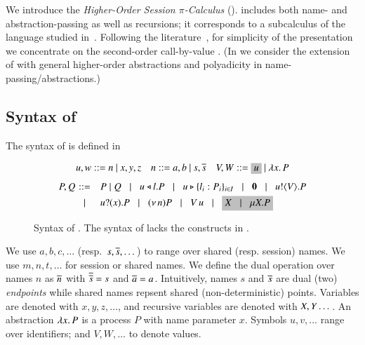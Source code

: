 \noindent 
We introduce the 
\emph{Higher-Order Session $\pi$-Calculus} (\HOp).
\HOp includes both name- and abstraction-passing 
as well as recursions; it corresponds to a subcalculus 
of the language
studied 
in~\cite{tlca07}. 
Following the literature~\cite{JeffreyR05},
for simplicity of the presentation
we concentrate on the second-order call-by-value \HOp.  
(In  we consider the extension of 
\HOp with general higher-order abstractions 
and polyadicity in name-passing/abstractions.)


\subsection{Syntax of \HOp}
\label{subsec:syntax}
\noindent{} The syntax of \HOp is defined in 
\begin{figure}[t]
\[ 
\begin{array}{lll}
u,w  ::=  n \ | \ x,y,z
& n ::= a,b  \ | \ s, \dual{s} 
& V,W  ::=   \nonhosyntax{u} \ | \ \abs{x}{P}
\end{array}
\]
\[
\begin{array}{rclllll}
P,Q \!\!\!\!\!\! & ::= & \!\! P\Par Q \bnfbar 
 \bsel{u}{l} P \bnfbar \bbra{u}{l_i:P_i}_{i \in I} \bnfbar \inact \bnfbar \bout{u}{V}{P} \\[1mm]
 & \bnfbar & \!\! \binp{u}{x}{P} \bnfbar \news{n} P 
\bnfbar 
\appl{V}{u}
\bnfbar \nonhosyntax{\rvar{X} \bnfbar \recp{X}{P}}
\end{array}
\]
 \caption{Syntax of \HOp. The syntax of \HO lacks the constructs in .}
\label{fig:syntax}
\Hline
\end{figure}
We use $a,b,c, \dots$ (resp.~$s, \overline{s}, \dots$) 
to range over shared (resp. session) names. 
We use $m, n, t, \dots$ for session or shared names. 
We define the dual operation over names $n$ as $\overline{n}$ with
$\overline{\overline{s}} = s$ and $\overline{a} = a$.
Intuitively, names $s$ and $\overline{s}$ are dual (two) \emph{endpoints} while 
shared names repsent shared (non-deterministic) points. 
Variables are denoted with $x, y, z, \dots$, 
and recursive variables are denoted with $X, Y \dots$.
An abstraction $\lambda x.\,P$ is a process $P$ with name parameter $x$.
Symbols $u, v, \dots$ range over identifiers; and  
$V, W, \dots$ to denote values. 


